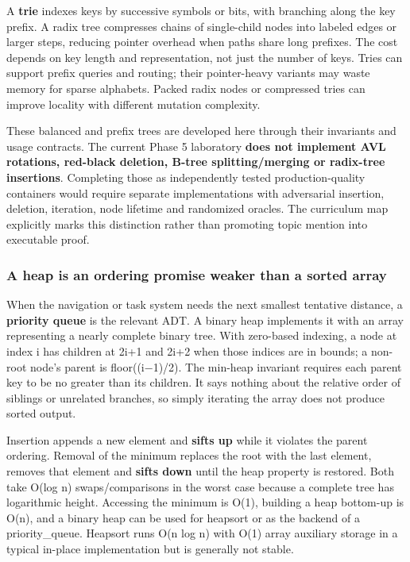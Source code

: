 A \textbf{trie} indexes keys by successive symbols or bits, with branching along the key prefix. A radix tree compresses chains of single-child nodes into labeled edges or larger steps, reducing pointer overhead when paths share long prefixes. The cost depends on key length and representation, not just the number of keys. Tries can support prefix queries and routing; their pointer-heavy variants may waste memory for sparse alphabets. Packed radix nodes or compressed tries can improve locality with different mutation complexity.

These balanced and prefix trees are developed here through their invariants and usage contracts. The current Phase 5 laboratory \textbf{does not implement AVL rotations, red-black deletion, B-tree splitting/merging or radix-tree insertions}. Completing those as independently tested production-quality containers would require separate implementations with adversarial insertion, deletion, iteration, node lifetime and randomized oracles. The curriculum map explicitly marks this distinction rather than promoting topic mention into executable proof.

\subsubsection{A heap is an ordering promise weaker than a sorted array}\label{a-heap-is-an-ordering-promise-weaker-than-a-sorted-array}

When the navigation or task system needs the next smallest tentative distance, a \textbf{priority queue} is the relevant ADT. A binary heap implements it with an array representing a nearly complete binary tree. With zero-based indexing, a node at index i has children at 2i+1 and 2i+2 when those indices are in bounds; a non-root node's parent is floor((i−1)/2). The min-heap invariant requires each parent key to be no greater than its children. It says nothing about the relative order of siblings or unrelated branches, so simply iterating the array does not produce sorted output.

Insertion appends a new element and \textbf{sifts up} while it violates the parent ordering. Removal of the minimum replaces the root with the last element, removes that element and \textbf{sifts down} until the heap property is restored. Both take O(log n) swaps/comparisons in the worst case because a complete tree has logarithmic height. Accessing the minimum is O(1), building a heap bottom-up is O(n), and a binary heap can be used for heapsort or as the backend of a priority\_queue. Heapsort runs O(n log n) with O(1) array auxiliary storage in a typical in-place implementation but is generally not stable.

